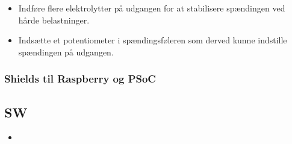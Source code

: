 \begin{itemize}
\item Indføre flere elektrolytter på udgangen for at stabilisere spændingen ved hårde belastninger.
\item Indsætte et potentiometer i spændingsføleren som derved kunne indstille spændingen på udgangen.
\end{itemize}

\subsubsection{Shields til Raspberry og PSoC}

\subsection{SW} 
\begin{itemize}
\item 
\end{itemize}

